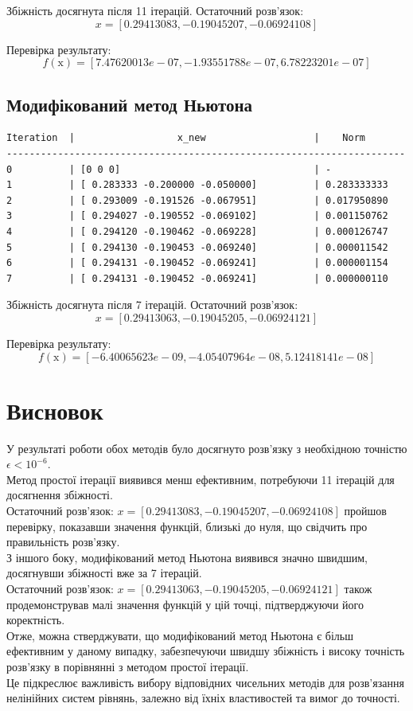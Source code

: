 \documentclass[a4paper, 12pt]{article}
\begin{document}
Збіжність досягнута після 11 ітерацій. Остаточний розв'язок:
\[
x = [ 0.29413083, -0.19045207, -0.06924108]
\]

Перевірка результату:
\[
f(\text{x}) = [ 7.47620013e-07, -1.93551788e-07,  6.78223201e-07]
\]

\subsection{Модифікований метод Ньютона}

\begin{verbatim}
Iteration  |                  x_new                   |    Norm   
----------------------------------------------------------------------
0          | [0 0 0]                                  | -
1          | [ 0.283333 -0.200000 -0.050000]          | 0.283333333
2          | [ 0.293009 -0.191526 -0.067951]          | 0.017950890
3          | [ 0.294027 -0.190552 -0.069102]          | 0.001150762
4          | [ 0.294120 -0.190462 -0.069228]          | 0.000126747
5          | [ 0.294130 -0.190453 -0.069240]          | 0.000011542
6          | [ 0.294131 -0.190452 -0.069241]          | 0.000001154
7          | [ 0.294131 -0.190452 -0.069241]          | 0.000000110
\end{verbatim}

Збіжність досягнута після 7 ітерацій. Остаточний розв'язок:
\[
x = [ 0.29413063, -0.19045205, -0.06924121]
\]

Перевірка результату:
\[
f(\text{x}) = [-6.40065623e-09, -4.05407964e-08,  5.12418141e-08]
\]

\newpage
\section{Висновок}

У результаті роботи обох методів було досягнуто розв'язку з необхідною точністю \(\epsilon < 10^{-6}\). \\ 

Метод простої ітерації виявився менш ефективним, потребуючи 11 ітерацій для досягнення збіжності. \\ 
Остаточний розв'язок: \(x = [0.29413083, -0.19045207, -0.06924108]\) пройшов перевірку, показавши значення функцій, близькі до нуля, що свідчить про правильність розв'язку. \\ 

З іншого боку, модифікований метод Ньютона виявився значно швидшим, досягнувши збіжності вже за 7 ітерацій. \\ 
Остаточний розв'язок: \(x = [0.29413063, -0.19045205, -0.06924121]\) також продемонстрував малі значення функцій у цій точці, підтверджуючи його коректність. \\ 

Отже, можна стверджувати, що модифікований метод Ньютона є більш ефективним у даному випадку, забезпечуючи швидшу збіжність і високу точність розв'язку в порівнянні з методом простої ітерації. \\ 

Це підкреслює важливість вибору відповідних чисельних методів для розв'язання нелінійних систем рівнянь, залежно від їхніх властивостей та вимог до точності.
\end{document}
